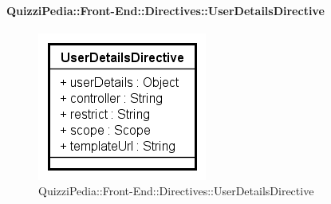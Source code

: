 \paragraph{QuizziPedia::Front-End::Directives::UserDetailsDirective}

\label{QuizziPedia::Front-End::Directives::UserDetailsDirective}

\begin{figure}[h]
	\centering
	\includegraphics[scale=0.80,keepaspectratio]{UML/Classi/Front-End/QuizziPedia_Front-end_Directives_UserDetailsDirective.png}
	\caption{QuizziPedia::Front-End::Directives::UserDetailsDirective}
\end{figure}

